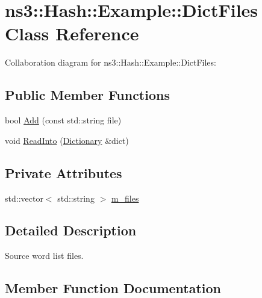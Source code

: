 \hypertarget{classns3_1_1Hash_1_1Example_1_1DictFiles}{}\section{ns3\+:\+:Hash\+:\+:Example\+:\+:Dict\+Files Class Reference}
\label{classns3_1_1Hash_1_1Example_1_1DictFiles}


Collaboration diagram for ns3\+:\+:Hash\+:\+:Example\+:\+:Dict\+Files\+:
\subsection*{Public Member Functions}
\begin{DoxyCompactItemize}
\item 
bool \hyperlink{classns3_1_1Hash_1_1Example_1_1DictFiles_a2c1ef714c9da605160b3e2d661985bc9}{Add} (const std\+::string file)
\item 
void \hyperlink{classns3_1_1Hash_1_1Example_1_1DictFiles_a59e6e06d279091c6163ba0282d25b778}{Read\+Into} (\hyperlink{classns3_1_1Hash_1_1Example_1_1Dictionary}{Dictionary} \&dict)
\end{DoxyCompactItemize}
\subsection*{Private Attributes}
\begin{DoxyCompactItemize}
\item 
std\+::vector$<$ std\+::string $>$ \hyperlink{classns3_1_1Hash_1_1Example_1_1DictFiles_a0f2c70e08b9eb66a95eb08637ddf6f92}{m\+\_\+files}
\end{DoxyCompactItemize}


\subsection{Detailed Description}
Source word list files. 

\subsection{Member Function Documentation}
